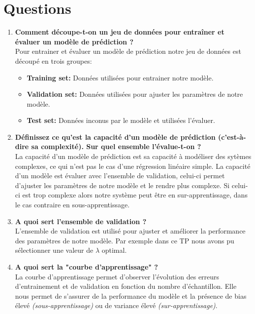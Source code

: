 \section{Questions}


\begin{enumerate}
    \item \textbf{Comment découpe-t-on un jeu de données pour entraîner et évaluer un modèle de prédiction ?}\\
    Pour entrainer et évaluer un modèle de prédiction notre jeu de données est découpé en trois groupes:
    \begin{itemize}
        \item \textbf{Training set:} Données utilisées pour entrainer notre modèle.
        \item \textbf{Validation set:} Données utilisées pour ajuster les paramètres de notre modèle.
        \item \textbf{Test set:} Données inconus par le modèle et utilisées l'évaluer.
    \end{itemize}

    \clearpage
    
    \item \textbf{Définissez ce qu'est la capacité d'un modèle de prédiction (c'est-à-dire sa complexité). Sur quel ensemble l'évalue-t-on ?} \\
    La capacité d'un modèle de prédiction est sa capacité à modéliser des sytèmes complexes, ce qui n'est pas le cas d'une régression linéaire simple. La capacité d'un modèle est évaluer avec l'ensemble de 
    validation, celui-ci permet d'ajuster les paramètres de notre modèle et le rendre plus complexe. Si celui-ci est trop complexe alors notre système peut être en sur-apprentissage, dans le cas contraire en sous-apprentissage.
    \vspace{0.5cm}

    \item \textbf{A quoi sert l'ensemble de validation ?} \\
    L'ensemble de validation est utilisé pour ajuster et améliorer la performance des paramètres de notre modèle. Par exemple dans ce TP nous avons pu sélectionner une valeur de $\lambda$ optimal.
    \vspace{0.5cm}

    \item \textbf{A quoi sert la "courbe d'apprentissage" ?} \\
    La courbe d'apprentissage permet d'observer l'évolution des erreurs d'entrainement et de validation en fonction du nombre d'échantillon. Elle nous permet de s'assurer de la performance du modèle et la présence de bias élevé 
    \textit{(sous-apprentissage)} ou de variance élevé \textit{(sur-apprentissage)}.


\end{enumerate}
